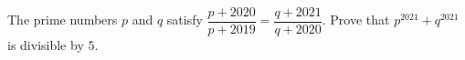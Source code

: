The prime numbers $p$ and $q$ satisfy $\dfrac{p+2020}{p+2019}=\dfrac{q+2021}{q+2020}$. Prove that $p^{2021}+q^{2021}$ is divisible by $5$.
